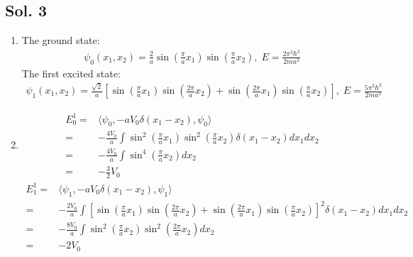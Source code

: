 \subsection*{Sol. 3}
\begin{enumerate}
    \item 
    The ground state:
    \begin{align*}
        \psi_0(x_1,x_2) = 
        \frac{2}{a}\sin\left(\frac{\pi}{a}x_1\right)\sin\left(\frac{\pi}{a}x_2\right),\; 
        E = \frac{2\pi^2\hbar^2}{2ma^2}
    \end{align*}
    The first excited state:
    \begin{align*}
        \psi_1(x_1,x_2) = 
        \frac{\sqrt{2}}{a}\left[\sin\left(\frac{\pi}{a}x_1\right)
        \sin\left(\frac{2\pi}{a}x_2\right)
        +
        \sin\left(\frac{2\pi}{a}x_1\right)
        \sin\left(\frac{\pi}{a}x_2\right)
        \right],\; 
        E = \frac{5\pi^2\hbar^2}{2ma^2}
    \end{align*}
    \item 
    \begin{align*}
        E_0^1 =  &
        \langle
        \psi_0, -aV_0\delta(x_1-x_2), 
        \psi_0
        \rangle\\
        =&
        -\frac{4V_0}{a}
        \int
        \sin^2\left(\frac{\pi}{a}x_1\right)\sin^2\left(\frac{\pi}{a}x_2\right)
        \delta(x_1-x_2)dx_1dx_2\\
        =&-\frac{4V_0}{a}\int\sin^4\left(\frac{\pi}{a}x_2\right)dx_2\\
        =&-\frac{3}{2}V_0
    \end{align*}
    \begin{align*}
        E_1^1 =  &
        \langle
        \psi_1, -aV_0\delta(x_1-x_2), 
        \psi_1
        \rangle\\
        =&
        -\frac{2V_0}{a}
        \int
        \left[\sin\left(\frac{\pi}{a}x_1\right)
        \sin\left(\frac{2\pi}{a}x_2\right)
        +
        \sin\left(\frac{2\pi}{a}x_1\right)
        \sin\left(\frac{\pi}{a}x_2\right)
        \right]^2
        \delta(x_1-x_2)dx_1dx_2\\
        =&-\frac{8V_0}{a}\int
        \sin^2\left(\frac{\pi}{a}x_2\right)
        \sin^2\left(\frac{2\pi}{a}x_2\right)
        dx_2\\
        =&-2V_0
    \end{align*}
\end{enumerate}

